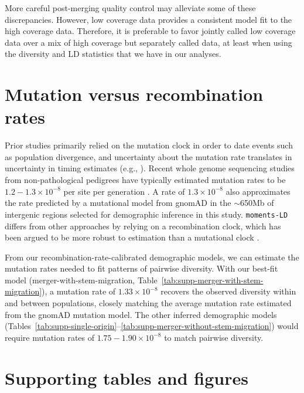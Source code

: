 \documentclass[]{article}
\begin{document}
More careful post-merging quality control may alleviate some of these
discrepancies. However, low coverage data provides a consistent model fit to
the high coverage data. Therefore, it is preferable to favor jointly called low
coverage data over a mix of high coverage but separately called data, at least
when using the diversity and LD statistics that we have in our analyses.

\section{Mutation versus recombination rates}
\label{sec:supp-mutation}

Prior studies primarily relied on the mutation clock in order to date events
such as population divergence, and uncertainty about the mutation rate
translates in uncertainty in timing estimates (e.g., \citet{Moorjani2016-qj}).
Recent whole genome sequencing studies from non-pathological pedigrees have
typically estimated mutation rates to be $1.2-1.3\times10^{-8}$ per site per
generation \citep{Sasani2019-zp,Tian2019-zv}. A rate of $1.3\times10^{-8}$ also
approximates the rate predicted by a mutational model from gnomAD
\citep{Karczewski2020-le} in the $\sim$650Mb of intergenic regions selected for
demographic inference in this study.
\texttt{moments-LD} differs from other approaches by
relying on a recombination clock, which has been argued to be more robust to
estimation than a mutational clock \citep{Moorjani2016-ur}.

From our recombination-rate-calibrated demographic models, we can estimate the
mutation rates needed to fit patterns of pairwise diversity. With our best-fit
model (merger-with-stem-migration,
Table~\ref{tab:supp-merger-with-stem-migration}), a mutation rate of
$1.33\times10^{-8}$ recovers the observed diversity within and between
populations, closely matching the average mutation rate estimated from the
gnomAD mutation model. The other inferred demographic models
(Tables~\ref{tab:supp-single-origin}--\ref{tab:supp-merger-without-stem-migration})
would require mutation rates of $1.75-1.90\times10^{-8}$ to match pairwise
diversity.






\clearpage

\section*{Supporting tables and figures}
\end{document}
